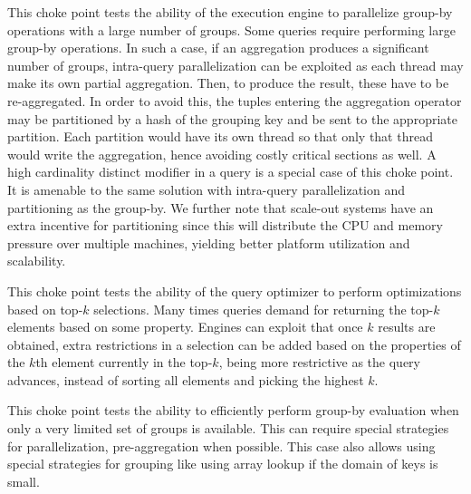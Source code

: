

This choke point tests the ability of the execution engine to parallelize group-by operations with a large number of groups. Some queries require performing large group-by operations.
In such a case, if an aggregation produces a significant number of groups, intra-query parallelization can be exploited as each thread may make its own partial aggregation.
Then, to produce the result, these have to be re-aggregated. In order to avoid this, the tuples entering the aggregation operator may be partitioned by a hash of the grouping key and be sent to the appropriate partition.
Each partition would have its own thread so that only that thread would write the aggregation, hence avoiding costly critical sections as well. A high cardinality distinct modifier in a query is a special case of this choke point.
It is amenable to the same solution with intra-query parallelization and partitioning as the group-by.
We further note that scale-out systems have an extra incentive for partitioning since this will distribute the CPU and memory pressure over multiple machines, yielding better platform utilization and scalability.





This choke point tests the ability of the query optimizer to perform optimizations based on top-$k$ selections. Many times queries demand for returning the top-$k$ elements based on some property.
Engines can exploit that once $k$ results are obtained, extra restrictions in a selection can be added based on the properties of the $k$th element currently in the top-$k$, being more restrictive as the query advances, instead of sorting all elements and picking the highest $k$.





This choke point tests the ability to efficiently perform group-by evaluation
when only a very limited set of groups is available.  This can require special
strategies for parallelization, \eg pre-aggregation when possible. This case also allows using special strategies for grouping like using array lookup if the domain of keys is small.

